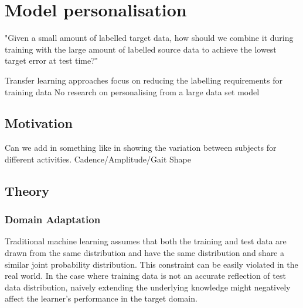 \chapter{Model personalisation}
\label{chp:personalisation}




"Given a small amount of labelled target data, how should we combine it during training with the large amount of labelled source data to achieve the lowest target error at test time?"

Transfer learning approaches focus on reducing the labelling requirements for training data
No research on personalising from a large data set model

\section{Motivation}
Can we add in something like in \cite{Cruciani2020} showing the variation between subjects for different activities. Cadence/Amplitude/Gait Shape


\section{Theory}

\subsection{Domain Adaptation} %
Traditional machine learning assumes that both the training and test data are drawn from the same distribution and have the same distribution and share a similar joint probability distribution. This constraint can be easily violated in the real world. In the case where training data is not an accurate reflection of test data distribution, naively extending the underlying knowledge might negatively affect the learner's performance in the target domain.\cite{Farahani2021}

